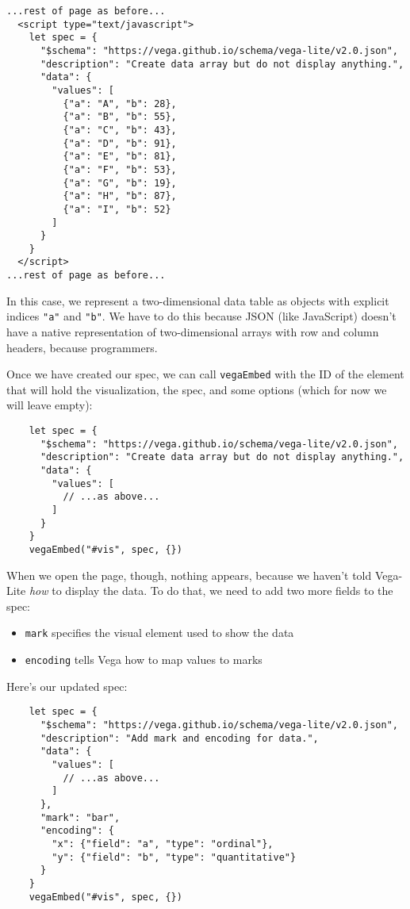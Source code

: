 \begin{verbatim}
...rest of page as before...
  <script type="text/javascript">
    let spec = {
      "$schema": "https://vega.github.io/schema/vega-lite/v2.0.json",
      "description": "Create data array but do not display anything.",
      "data": {
        "values": [
          {"a": "A", "b": 28},
          {"a": "B", "b": 55},
          {"a": "C", "b": 43},
          {"a": "D", "b": 91},
          {"a": "E", "b": 81},
          {"a": "F", "b": 53},
          {"a": "G", "b": 19},
          {"a": "H", "b": 87},
          {"a": "I", "b": 52}
        ]
      }
    }
  </script>
...rest of page as before...
\end{verbatim}

In this case,
we represent a two-dimensional data table as objects with explicit indices \texttt{"a"} and \texttt{"b"}.
We have to do this because JSON (like JavaScript) doesn't have a native representation
of two-dimensional arrays with row and column headers,
because programmers.

Once we have created our spec,
we can call \texttt{vegaEmbed} with the ID of the element that will hold the visualization,
the spec,
and some options (which for now we will leave empty):

\begin{verbatim}
    let spec = {
      "$schema": "https://vega.github.io/schema/vega-lite/v2.0.json",
      "description": "Create data array but do not display anything.",
      "data": {
        "values": [
          // ...as above...
        ]
      }
    }
    vegaEmbed("#vis", spec, {})
\end{verbatim}

When we open the page, though, nothing appears,
because we haven't told Vega-Lite \emph{how} to display the data.
To do that,
we need to add two more fields to the spec:

\begin{itemize}
\item
  \texttt{mark} specifies the visual element used to show the data
\item
  \texttt{encoding} tells Vega how to map values to marks
\end{itemize}

Here's our updated spec:

\begin{verbatim}
    let spec = {
      "$schema": "https://vega.github.io/schema/vega-lite/v2.0.json",
      "description": "Add mark and encoding for data.",
      "data": {
        "values": [
          // ...as above...
        ]
      },
      "mark": "bar",
      "encoding": {
        "x": {"field": "a", "type": "ordinal"},
        "y": {"field": "b", "type": "quantitative"}
      }
    }
    vegaEmbed("#vis", spec, {})
\end{verbatim}

